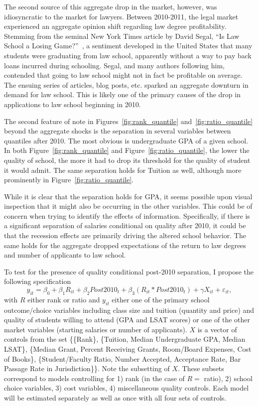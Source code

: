 \documentclass[12pt]{article}
\theoremstyle{definition}
\begin{document}
The second source of this aggregate drop in the market, however, was idiosyncratic to the market for lawyers. Between 2010-2011, the legal market experienced an aggregate opinion shift regarding law degree profitability. Stemming from the seminal New York Times article by David Segal, ``Is Law School a Losing Game?''~\cite{Segal}, a sentiment developed in the United States that many students were graduating from law school, apparently without a way to pay back loans incurred during schooling. Segal, and many authors following him, contended that going to law school might not in fact be profitable on average. The ensuing series of articles, blog posts, etc. sparked an aggregate downturn in demand for law school. This is likely one of the primary causes of the drop in applications to law school beginning in 2010.

The second feature of note in Figures~\ref{fig:rank_quantile} and~\ref{fig:ratio_quantile} beyond the aggregate shocks is the separation in several variables between quantiles after 2010. The most obvious is undergraduate GPA of a given school. In both Figure~\ref{fig:rank_quantile} and Figure~\ref{fig:ratio_quantile}, the lower the quality of school, the more it had to drop its threshold for the quality of student it would admit. The same separation holds for Tuition as well, although more prominently in Figure~\ref{fig:ratio_quantile}.

While it is clear that the separation holds for GPA, it seems possible upon visual inspection that it might also be occurring in the other variables. This could be of concern when trying to identify the effects of information. Specifically, if there is a significant separation of salaries conditional on quality after 2010, it could be that the recession effects are primarily driving the altered school behavior. The same holds for the aggregate dropped expectations of the return to law degrees and number of applicants to law school.

To test for the presence of quality conditional post-2010 separation, I propose the following specification
\begin{equation}
	y_{it} = \beta_0 + \beta_1 R_{it} + \beta_2 Post2010_t +
			 \beta_3 (R_{it} * Post2010_t) + \gamma X_{it} + \varepsilon_{it},
	\label{eq:diff_in_diff}
\end{equation}
with $R$ either rank or ratio and $y_{it}$ either one of the primary school outcome/choice variables including class size and tuition (quantity and price) and quality of students willing to attend (GPA and LSAT scores) or one of the other market variables (starting salaries or number of applicants). $X$ is a vector of controls from the set \{\{Rank\}, \{Tuition, Median Undergraduate GPA, Median LSAT\}, \{Median Grant, Percent Receiving Grants, Room/Board Expenses, Cost of Books\}, \{Student/Faculty Ratio, Number Accepted, Acceptance Rate, Bar Passage Rate in Jurisdiction\}\}. Note the subsetting of $X$. These subsets correspond to models controlling for 1) rank (in the case of $R=$ ratio), 2) school choice variables, 3) cost variables, 4) miscellaneous quality controls. Each model will be estimated separately as well as once with all four sets of controls.
\end{document}
